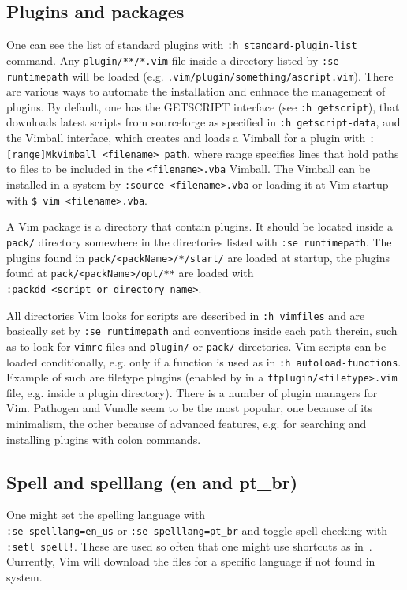 \documentclass{article}
\newcommand{\tttt}[1]{\texttt{#1}}
\begin{document}
\subsection{Plugins and packages}
One can see the list of standard plugins
with \tttt{:h standard-plugin-list} command.
Any \tttt{plugin/**/*.vim} file inside a directory
listed by \tttt{:se runtimepath} will be loaded
(e.g. \tttt{.vim/plugin/something/ascript.vim}).
There are various ways to automate the installation
and enhnace the management of plugins.
By default, one has the GETSCRIPT interface (see \tttt{:h getscript}),
that downloads latest scripts from sourceforge as specified in \tttt{:h getscript-data},
and the Vimball interface, which creates and loads a Vimball for a plugin
with \tttt{:[range]MkVimball <filename> path}, where range specifies lines
that hold paths to files to be included in the \tttt{<filename>.vba} Vimball.
The Vimball can be installed in a system by \tttt{:source <filename>.vba}
or loading it at Vim startup with \tttt{\$ vim <filename>.vba}.

A Vim package is a directory that contain plugins.
It should be located inside a \tttt{pack/} directory
somewhere in the directories listed with \tttt{:se runtimepath}.
The plugins found in \tttt{pack/<packName>/*/start/} are loaded
at startup, the plugins found at
\tttt{pack/<packName>/opt/**} are loaded with\\
\tttt{:packdd <script\_or\_directory\_name>}.

All directories Vim looks for scripts are described
in \tttt{:h vimfiles} and are basically set by
\tttt{:se runtimepath} and conventions inside
each path therein, such as to look for \tttt{vimrc} files
and \tttt{plugin/} or \tttt{pack/} directories.
Vim scripts can be loaded conditionally,
e.g. only if a function is used as in \tttt{:h autoload-functions}.
Example of such are filetype plugins (enabled by in a \tttt{ftplugin/<filetype>.vim} file,
e.g. inside a plugin directory).
There is a number of plugin managers for Vim.
Pathogen and Vundle seem to be the most popular,
one because of its minimalism, the other because of
advanced features, e.g. for searching and installing plugins with
colon commands.

\subsection{Spell and spelllang (en and pt\_br)}
One might set the spelling language with\\ \tttt{:se spelllang=en\_us}
or \tttt{:se spelllang=pt\_br}
and toggle spell checking with \tttt{:setl spell!}.
These are used so often that one might use shortcuts as in~\cite{vimrc}.
Currently, Vim will download the files for a specific language if
not found in system.
\end{document}
